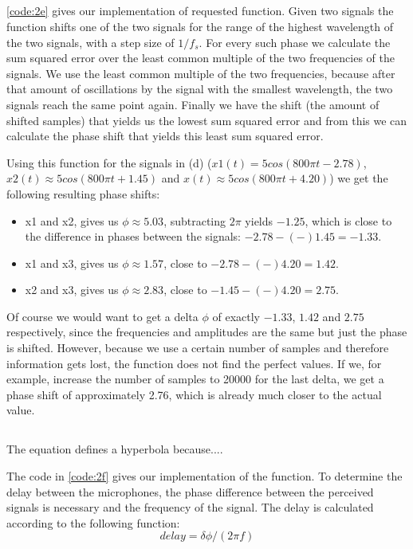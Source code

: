 \documentclass{article}
\begin{document}
\subsection{}
\autoref{code:2e} gives our implementation of requested function. Given two signals the function shifts one of the two signals
for the range of the highest wavelength of the two signals, with a step size of $1/f_s$. For every such phase we calculate the sum squared error over the least common multiple of the two frequencies of the signals.
We use the least common multiple of the two frequencies, because after that amount of oscillations by the signal with the smallest
wavelength, the two signals reach the same point again. Finally we have the shift (the amount of shifted samples) that yields us the lowest sum squared error and
from this we can calculate the phase shift that yields this least sum squared error.

Using this function for the signals in (d) ($x1(t) = 5cos(800 \pi t - 2.78)$, $x2(t) \approx 5cos(800 \pi t + 1.45)$ and $x(t) \approx 5cos(800 \pi t + 4.20)$)
we get the following resulting phase shifts:
\begin{itemize}
 \item x1 and x2, gives us $\phi \approx 5.03$, subtracting $2\pi$ yields $-1.25$, which is close to the difference in phases between the signals: $-2.78 - (-) 1.45 = -1.33$.
 \item x1 and x3, gives us $\phi \approx 1.57$, close to $-2.78 - (-)4.20 = 1.42$.
 \item x2 and x3, gives us $\phi \approx 2.83$, close to $-1.45 - (-)4.20 = 2.75$.
\end{itemize}
Of course we would want to get a delta $\phi$ of exactly $-1.33$, $1.42$ and $2.75$ respectively, since the frequencies and amplitudes are the same
but just the phase is shifted. However, because we use a certain number of samples and therefore information gets lost,
the function does not find the perfect values. If we, for example, increase the number of samples to 20000 for the last delta, 
we get a phase shift of approximately 2.76, which is already much closer to the actual value.

\subsection{}
The equation defines a hyperbola because....

The code in \autoref{code:2f} gives our implementation of the function. To determine the delay between the microphones, 
the phase difference between the perceived signals is necessary and the frequency of the signal. The delay is calculated 
according to the following function:
\begin{equation}
 delay = \delta \phi / (2\pi f)
\end{equation}
\end{document}
